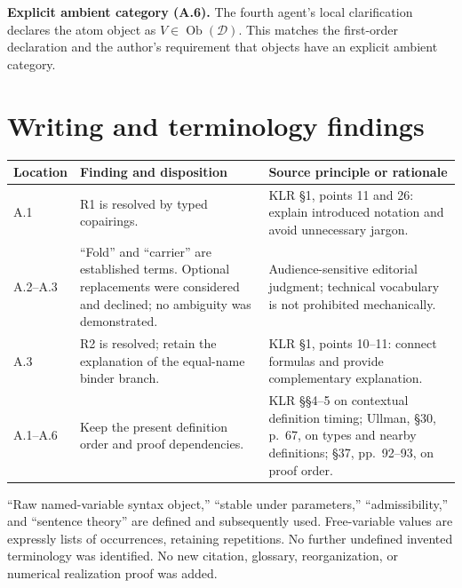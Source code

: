 \documentclass[10pt]{article}
\newcommand{\D}{\mathcal D}
\begin{document}
\textbf{Explicit ambient category (A.6).}
The fourth agent's local clarification declares the atom object as
$V\in\operatorname{Ob}(\D)$. This matches the first-order declaration
and the author's requirement that objects have an explicit ambient category.

\section*{Writing and terminology findings}
\begin{tabularx}{\textwidth}{@{}L{0.13\textwidth}Y Y@{}}
\toprule
Location & Finding and disposition & Source principle or rationale\\\midrule
A.1 & R1 is resolved by typed copairings. & KLR \S1, points 11 and 26:
explain introduced notation and avoid unnecessary jargon.\\
A.2--A.3 & ``Fold'' and ``carrier'' are established terms. Optional replacements
were considered and declined; no ambiguity was demonstrated. & Audience-sensitive
editorial judgment; technical vocabulary is not prohibited mechanically.\\
A.3 & R2 is resolved; retain the explanation of the equal-name binder branch.
& KLR \S1, points 10--11: connect formulas and provide complementary explanation.\\
A.1--A.6 & Keep the present definition order and proof dependencies.
& KLR \S\S4--5 on contextual definition timing; Ullman, \S30, p.~67, on
types and nearby definitions; \S37, pp.~92--93, on proof order.\\\bottomrule
\end{tabularx}

``Raw named-variable syntax object,'' ``stable under parameters,''
``admissibility,'' and ``sentence theory'' are defined and subsequently used.
Free-variable values are expressly lists of occurrences, retaining repetitions.
No further undefined invented terminology was identified. No new citation,
glossary, reorganization, or numerical realization proof was added.

\newpage
\end{document}
